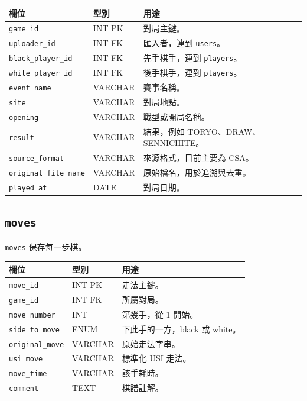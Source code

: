 \documentclass[12pt,a4paper,fontset=none]{ctexart}
\begin{document}
\begin{longtable}{p{}p{}p{}}
\toprule
\textbf{欄位} & \textbf{型別} & \textbf{用途}\\
\midrule
\endhead
\texttt{game\_id} & INT PK & 對局主鍵。\\
\texttt{uploader\_id} & INT FK & 匯入者，連到 \texttt{users}。\\
\texttt{black\_player\_id} & INT FK & 先手棋手，連到 \texttt{players}。\\
\texttt{white\_player\_id} & INT FK & 後手棋手，連到 \texttt{players}。\\
\texttt{event\_name} & VARCHAR & 賽事名稱。\\
\texttt{site} & VARCHAR & 對局地點。\\
\texttt{opening} & VARCHAR & 戰型或開局名稱。\\
\texttt{result} & VARCHAR & 結果，例如 TORYO、DRAW、SENNICHITE。\\
\texttt{source\_format} & VARCHAR & 來源格式，目前主要為 CSA。\\
\texttt{original\_file\_name} & VARCHAR & 原始檔名，用於追溯與去重。\\
\texttt{played\_at} & DATE & 對局日期。\\
\bottomrule
\end{longtable}

\subsection{\texttt{moves}}

\texttt{moves} 保存每一步棋。

\begin{longtable}{p{}p{}p{}}
\toprule
\textbf{欄位} & \textbf{型別} & \textbf{用途}\\
\midrule
\endhead
\texttt{move\_id} & INT PK & 走法主鍵。\\
\texttt{game\_id} & INT FK & 所屬對局。\\
\texttt{move\_number} & INT & 第幾手，從 1 開始。\\
\texttt{side\_to\_move} & ENUM & 下此手的一方，black 或 white。\\
\texttt{original\_move} & VARCHAR & 原始走法字串。\\
\texttt{usi\_move} & VARCHAR & 標準化 USI 走法。\\
\texttt{move\_time} & VARCHAR & 該手耗時。\\
\texttt{comment} & TEXT & 棋譜註解。\\
\bottomrule
\end{longtable}
\end{document}
